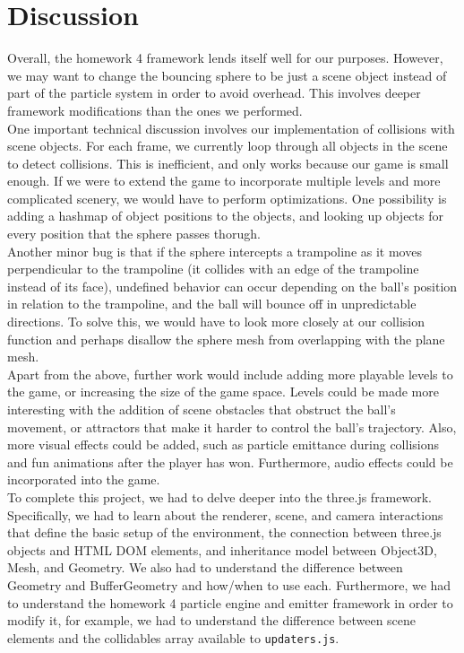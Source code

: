 \documentclass[a4paper]{article}
\begin{document}
\section{Discussion}
Overall, the homework 4 framework lends itself well for our purposes. However, we may want to change the bouncing sphere to be just a scene object instead of part of the particle system in order to avoid overhead. This involves deeper framework modifications than the ones we performed. \\
One important technical discussion involves our implementation of collisions with scene objects. For each frame, we currently loop through all objects in the scene to detect collisions. This is inefficient, and only works because our game is small enough. If we were to extend the game to incorporate multiple levels and more complicated scenery, we would have to perform optimizations. One possibility is adding a hashmap of object positions to the objects, and looking up objects for every position that the sphere passes thorugh. \\
Another minor bug is that if the sphere intercepts a trampoline as it moves perpendicular to the trampoline (it collides with an edge of the trampoline instead of its face), undefined behavior can occur depending on the ball's position in relation to the trampoline, and the ball will bounce off in unpredictable directions. To solve this, we would have to look more closely at our collision function and perhaps disallow the sphere mesh from overlapping with the plane mesh. \\
Apart from the above, further work would include adding more playable levels to the game, or increasing the size of the game space. Levels could be made more interesting with the addition of scene obstacles that obstruct the ball's movement, or attractors that make it harder to control the ball's trajectory. Also, more visual effects could be added, such as particle emittance during collisions and fun animations after the player has won. Furthermore, audio effects could be incorporated into the game. \\
To complete this project, we had to delve deeper into the three.js framework. Specifically, we had to learn about the renderer, scene, and camera interactions that define the basic setup of the environment, the connection between three.js objects and HTML DOM elements, and inheritance model between Object3D, Mesh, and Geometry. We also had to understand the difference between Geometry and BufferGeometry and how/when to use each. Furthermore, we had to understand the homework 4 particle engine and emitter framework in order to modify it, for example, we had to understand the difference between scene elements and the collidables array available to \texttt{updaters.js}.
\end{document}
